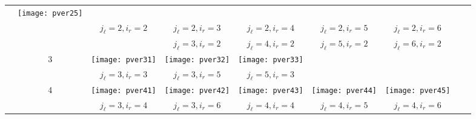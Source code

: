 \documentclass[12pt]{article}
\theoremstyle{definition}
\theoremstyle{remark}
\begin{document}
\begin{table}
{\begin{tabular}{ r|c|c|c|c|c|c|c|c| }
\begin{minipage}{.20\textwidth}
\end{minipage} & \begin{minipage}{.20\textwidth}
\texttt{[image: pver25]}
\end{minipage}    \\
\cline{3-7}
&  & $j_{\ell}=2,i_r=2$ & $j_{\ell}=2,i_r=3$ & $j_{\ell}=2,i_r=4$ & $j_{\ell}=2,i_r=5$ & $j_{\ell}=2,i_r=6$   \\
\cline{3-7}
&  & & $j_{\ell}=3,i_r=2$ & $j_{\ell}=4,i_r=2$ & $j_{\ell}=5,i_r=2$ & $j_{\ell}=6,i_r=2$   \\
\cline{2-7}
& 3 & \begin{minipage}{.20\textwidth}\vspace{2mm}
	\texttt{[image: pver31]}\vspace{2mm}
\end{minipage} & \begin{minipage}{.20\textwidth}
\texttt{[image: pver32]}
\end{minipage} & \begin{minipage}{.20\textwidth}
\texttt{[image: pver33]}
\end{minipage} &  &    \\
\cline{3-7}
&  & $j_{\ell}=3,i_r=3$ & $j_{\ell}=3,i_r=5$ & $j_{\ell}=5,i_r=3$ & &    \\
\cline{2-7}
& 4 & \begin{minipage}{.20\textwidth}\vspace{2mm}
	\texttt{[image: pver41]}\vspace{2mm}
\end{minipage} & \begin{minipage}{.20\textwidth}
\texttt{[image: pver42]}
\end{minipage} & \begin{minipage}{.20\textwidth}
\texttt{[image: pver43]}
\end{minipage} & \begin{minipage}{.20\textwidth}
\texttt{[image: pver44]}
\end{minipage} & \begin{minipage}{.20\textwidth}
\texttt{[image: pver45]}
\end{minipage}    \\
\cline{3-7}
&  & $j_{\ell}=3,i_r=4$ & $j_{\ell}=3,i_r=6$ & $j_{\ell}=4,i_r=4$ & $j_{\ell}=4,i_r=5$ & $j_{\ell}=4,i_r=6$   \\

\end{tabular}}
\end{table}
\end{document}
